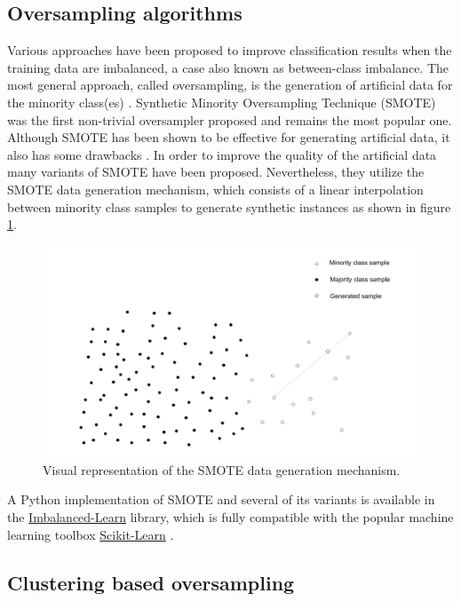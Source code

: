\documentclass[preprint,12pt, a4paper]{elsarticle}
\begin{document}
\subsection{Oversampling algorithms}
\label{oversampling}

Various approaches have been proposed to improve classification results when the training data are imbalanced, a case also known as between-class imbalance. The most general approach, called oversampling, is the generation of artificial data for the minority class(es) \cite{Fernandez2013}. Synthetic Minority Oversampling Technique (SMOTE) \cite{Chawla2002} was the first non-trivial oversampler proposed and remains the most popular one. Although SMOTE has been shown to be effective for generating artificial data, it also has some drawbacks \cite{He2009}. In order to improve the quality of the artificial data many variants of SMOTE have been proposed. Nevertheless, they utilize the SMOTE data generation mechanism, which consists of a linear interpolation between minority class samples to generate synthetic instances as shown in figure \ref{fig:smote}.

\begin{figure}[H]
	\centering
	\includegraphics[width=1\linewidth]{../analysis/smote}
	\caption{Visual representation of the SMOTE data generation mechanism.}
	\label{fig:smote}
\end{figure}

A Python implementation of SMOTE and several of its variants is available in the \href{https://imbalanced-learn.org/stable/}{Imbalanced-Learn} \cite{Lemaitre2016} library, which is fully compatible with the popular machine learning toolbox \href{https://scikit-learn.org/stable/}{Scikit-Learn} \cite{Pedregosa2011}.

\subsection{Clustering based oversampling}
\label{clustering-oversampling}
\end{document}
